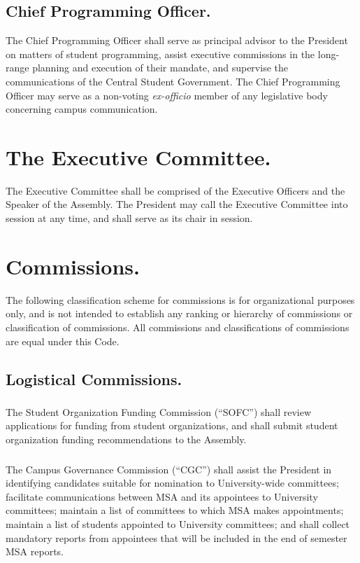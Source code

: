 \subsection{Chief Programming Officer.}
The Chief Programming Officer shall serve as principal advisor to the President on matters of student programming, assist executive commissions in the long-range planning and execution of their mandate, and supervise the communications of the Central Student Government. The Chief Programming Officer may serve as a non-voting \textit{ex-officio} member of any legislative body concerning campus communication.


\section{The Executive Committee.}
The Executive Committee shall be comprised of the Executive Officers and the Speaker of the Assembly.  The President may call the Executive Committee into session at any time, and shall serve as its chair in session.


\section{Commissions.}
The following classification scheme for commissions is for organizational purposes only, and is not intended to establish any ranking or hierarchy of commissions or classification of commissions.  All commissions and classifications of commissions are equal under this Code.

\subsection{Logistical Commissions.}

\subsubsection{}
The Student Organization Funding Commission (``SOFC'') shall review applications for funding from student organizations, and shall submit student organization funding recommendations to the Assembly.

\subsubsection{}
The Campus Governance Commission (``CGC'') shall
\subsubsubsection{}
assist the President in identifying candidates suitable for nomination to University-wide committees;
\subsubsubsection{}
facilitate communications between MSA and its appointees to University committees; 
\subsubsubsection{}
maintain a list of committees to which MSA makes appointments;
\subsubsubsection{}
maintain a list of students appointed to University committees; and
\subsubsubsection{}
shall collect mandatory reports from appointees that will be included in the end of semester MSA reports.

